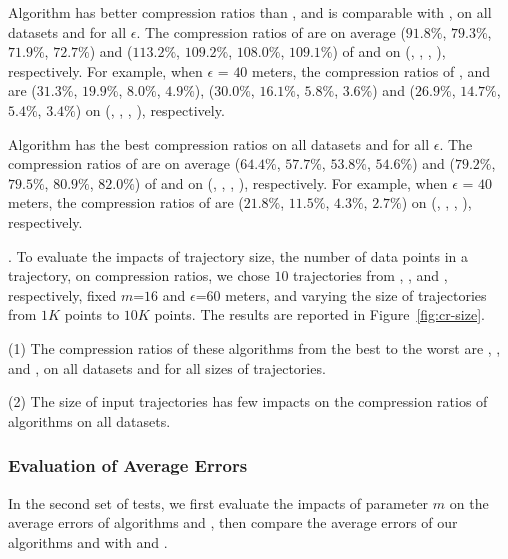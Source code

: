  Algorithm \cist has better compression ratios than \squishe, and is {comparable} with \dps, on all datasets and for all $\epsilon$.
The compression ratios of \cist are on average ($91.8\%$, $79.3\%$, $71.9\%$, {$72.7\%$}) and ($113.2\%$, $109.2\%$, $108.0\%$, $109.1\%$) of \squishe and \dps on (\truck, \sercar, \geolife, \pricar), respectively.
For example, when $\epsilon$ = $40$ meters, the compression ratios of \squishe, \cist and \dps are ($31.3\%$, $19.9\%$, $8.0\%$, $4.9\%$), ($30.0\%$, $16.1\%$, $5.8\%$, $3.6\%$) and ($26.9\%$, $14.7\%$, $5.4\%$, $3.4\%$) on (\truck, \sercar, \geolife, \pricar), respectively.

 Algorithm \cista has {the best} compression ratios on all datasets and for all $\epsilon$.
The compression ratios of \cista are on average ($64.4\%$, $57.7\%$, $53.8\%$, {$54.6\%$}) and ($79.2\%$, $79.5\%$, $80.9\%$, $82.0\%$) of \squishe and \dps on (\truck, \sercar, \geolife, \pricar), respectively.
For example, when $\epsilon$ = $40$ meters, the compression ratios of \cista are ($21.8\%$, $11.5\%$, $4.3\%$, $2.7\%$) on (\truck, \sercar, \geolife, \pricar), respectively.


.
To evaluate the impacts of trajectory size, \ie the number of data points in a trajectory, on compression ratios,
we chose {$10$} trajectories from \truck, \sercar, \geolife and \pricar, respectively,
fixed {$m$=$16$} and $\epsilon$=$60$ meters, and varying the size  of trajectories from $1K$ points to $10K$ points.
%
The results are reported in Figure~\ref{fig:cr-size}.

\ni(1) The compression ratios of these algorithms from the best to the worst are \cista, \dps, \cist and \squishe, on all datasets and for all sizes of trajectories. %

\ni(2) The size of input trajectories has few impacts on the compression ratios of \lsa algorithms on all datasets.





\subsubsection{Evaluation of Average Errors}
In the second set of tests, we first evaluate the impacts of parameter $m$ on the average errors of algorithms \cist and \cista, then compare the average errors of our algorithms \cist and \cista with \dps and \squishe.

